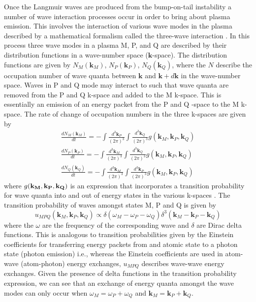 Once the Langmuir waves are produced from the bump-on-tail instability a number of wave interaction processes occur in order to bring about plasma emission. This involves the interaction of various wave modes in the plasma described by a mathematical formalism called the three-wave interaction \citep{robinson1993, robinson1994}. In this process three wave modes in a plasma M, P, and Q are described by their distribution functions in a wave-number space ($\mathbf{k}$-space). The distribution functions are given by $N_M(\mathbf{k}_M)$, $N_P(\mathbf{k}_P)$, $N_Q(\mathbf{k}_Q)$, where the $N$ describe the occupation number of wave quanta between $\mathbf{k}$ and $\mathbf{k}+d\mathbf{k}$ in the wave-number space. Waves in P and Q mode may interact to such that wave quanta are removed from the P and Q k-space and added to the M k-space. This is essentially an emission of an energy packet from the P and Q -space to the M k-space. The rate of change of occupation numbers in the three k-spaces are given by
\begin{eqnarray}
\frac{dN_M(\mathbf{k}_M)}{dt} = -\int \frac{d^3\mathbf{k}_P}{(2\pi)^3}\int \frac{d^3\mathbf{k}_Q}{(2\pi)^3}g(\mathbf{k}_M, \mathbf{k}_P, \mathbf{k}_Q) \\
%
\frac{dN_P(\mathbf{k}_P)}{dt} = -\int \frac{d^3\mathbf{k}_M}{(2\pi)^3}\int \frac{d^3\mathbf{k}_Q}{(2\pi)^3}g(\mathbf{k}_M, \mathbf{k}_P, \mathbf{k}_Q) \\
%
\frac{dN_Q(\mathbf{k}_Q)}{dt} = -\int \frac{d^3\mathbf{k}_M}{(2\pi)^3}\int \frac{d^3\mathbf{k}_P}{(2\pi)^3}g(\mathbf{k}_M, \mathbf{k}_P, \mathbf{k}_Q)
\end{eqnarray}
where $g(\bf{k}_M, \bf{k}_P, \bf{k}_Q)$ is an expression that incorporates a transition probability for wave quanta into and out of energy states in the various k-spaces \citep{robinson1994}. The transition probability of waves amongst states M, P and Q is given by \citep{melrose1986}
\begin{equation}
u_{MPQ}(\mathbf{k}_M, \mathbf{k}_P, \mathbf{k}_Q)  \propto \delta(\omega_M - \omega_P - \omega_Q ) \delta^3(\mathbf{k}_M - \mathbf{k}_P - \mathbf{k}_Q )
\end{equation}
where the $\omega$ are the frequency of the corresponding wave and $\delta$ are Dirac delta functions. This is analogous to transition probabilities given by the Einstein coefficients for transferring energy packets from and atomic state to a photon state (photon emission) i.e., whereas the Einstein coefficients are used in atom-wave (atom-photon) energy exchanges, $u_{MPQ}$ describes wave-wave energy exchanges. Given the presence of delta functions in the transition probability expression, we can see that an exchange of energy quanta amongst the wave modes can only occur when $\omega_M =  \omega_P +\omega_Q$ and $\mathbf{k}_M  =  \mathbf{k}_P + \mathbf{k}_Q$.
